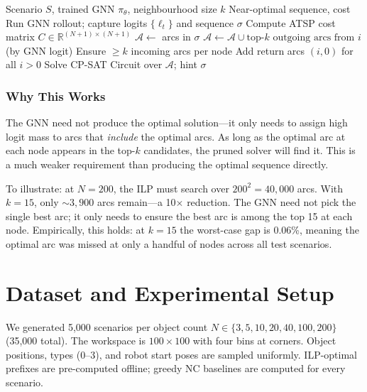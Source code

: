 \documentclass[conference]{IEEEtran}
\begin{document}
\begin{algorithm}[htbp]
\caption{GNN-Guided Arc Pruning}
\label{alg:pruned}
\begin{algorithmic}[1]
\REQUIRE Scenario $S$, trained GNN $\pi_\theta$, neighbourhood size $k$
\ENSURE Near-optimal sequence, cost
\STATE Run GNN rollout; capture logits $\{\ell_t\}$ and sequence $\sigma$
\STATE Compute ATSP cost matrix $C \in \mathbb{R}^{(N+1)\times(N+1)}$
\STATE $\mathcal{A} \leftarrow$ arcs in $\sigma$
    \STATE $\mathcal{A} \leftarrow \mathcal{A} \cup \text{top-}k\text{ outgoing arcs from } i$ (by GNN logit)
\ENDFOR
\STATE Ensure $\geq k$ incoming arcs per node
\STATE Add return arcs $(i, 0)$ for all $i > 0$
\STATE Solve CP-SAT Circuit over $\mathcal{A}$; hint $\sigma$
\end{algorithmic}
\end{algorithm}

\subsubsection{Why This Works} The GNN need not produce the optimal solution---it only needs to assign high logit mass to arcs that \emph{include} the optimal arcs. As long as the optimal arc at each node appears in the top-$k$ candidates, the pruned solver will find it. This is a much weaker requirement than producing the optimal sequence directly.

To illustrate: at $N{=}200$, the ILP must search over $200^2 = 40{,}000$ arcs. With $k{=}15$, only ${\sim}3{,}900$ arcs remain---a 10$\times$ reduction. The GNN need not pick the single best arc; it only needs to ensure the best arc is among the top 15 at each node. Empirically, this holds: at $k{=}15$ the worst-case gap is 0.06\%, meaning the optimal arc was missed at only a handful of nodes across all test scenarios.

\section{Dataset and Experimental Setup}\label{sec:data}

We generated 5{,}000 scenarios per object count $N \in \{3, 5, 10, 20, 40, 100, 200\}$ (35{,}000 total). The workspace is $100 \times 100$ with four bins at corners. Object positions, types (0--3), and robot start poses are sampled uniformly. ILP-optimal prefixes are pre-computed offline; greedy NC baselines are computed for every scenario.
\end{document}
